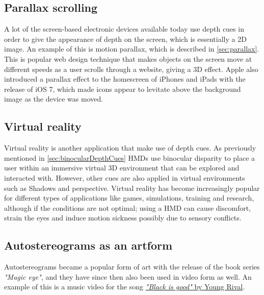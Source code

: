 	\subsection{Parallax scrolling}
	A lot of the screen-based electronic devices available today use depth cues in order to give the appearance of depth on the screen, which is essentially a 2D image. An example of this is motion parallax, which is described in \autoref{sec:parallax}. This is popular web design technique that makes objects on the screen move at different speeds as a user scrolls through a website, giving a 3D effect\citep{parallaxWeb}. Apple also introduced a parallax effect to the homescreen of iPhones and iPads with the release of iOS 7, which made icons appear to levitate above the background image as the device was moved\citep{ios7}.

	\subsection{Virtual reality}
	Virtual reality is another application that make use of depth cues. As previously mentioned in \autoref{sec:binocularDepthCues} HMDs use binocular disparity to place a user within an immersive virtual 3D environment that can be explored and interacted with\citep{hmdCues}. However, other cues are also applied in virtual environments such as Shadows and perspective. Virtual reality has become increasingly popular for different types of applications like games, simulations, training and research, although if the conditions are not optimal; using a HMD can cause discomfort, strain the eyes and induce motion sickness possibly due to sensory conflicts\citep{hmdCues,motionSickness}.

	\subsection{Autostereograms as an artform}
	Autostereograms became a popular form of art with the release of the book series \textit{"Magic eye"}\citep{autostereograms}, and they have since then also been used in video form as well. An example of this is a music video for the song \href{https://www.youtube.com/watch?v=2AKtp3XHn38}{\color{blue}\textit{"Black is good"} by Young Rival}.

